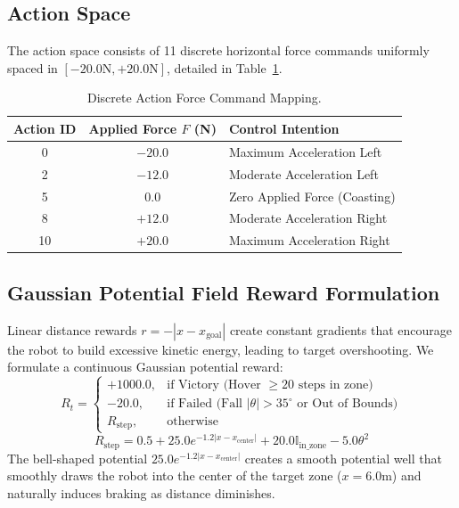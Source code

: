 \documentclass[journal,twocolumn]{IEEEtran}
\begin{document}
\subsection{Action Space}
The action space consists of 11 discrete horizontal force commands uniformly spaced in $[-20.0\text{N}, +20.0\text{N}]$, detailed in Table~\ref{tab:action_space}.

\begin{table}[H]
\centering
\caption{Discrete Action Force Command Mapping.}
\label{tab:action_space}
\begin{tabular}{ccl}
\toprule
\textbf{Action ID} & \textbf{Applied Force $F$ (N)} & \textbf{Control Intention} \\ 
\midrule
0 & $-20.0$ & Maximum Acceleration Left \\
2 & $-12.0$ & Moderate Acceleration Left \\
5 & $0.0$    & Zero Applied Force (Coasting) \\
8 & $+12.0$  & Moderate Acceleration Right \\
10 & $+20.0$ & Maximum Acceleration Right \\
\bottomrule
\end{tabular}
\end{table}

\subsection{Gaussian Potential Field Reward Formulation}
Linear distance rewards $r = -|x - x_{\text{goal}}|$ create constant gradients that encourage the robot to build excessive kinetic energy, leading to target overshooting. We formulate a continuous Gaussian potential reward:
\begin{equation}
R_t = \begin{cases} 
+1000.0, & \text{if Victory (Hover } \ge 20 \text{ steps in zone)} \\
-20.0, & \text{if Failed (Fall } |\theta| > 35^\circ \text{ or Out of Bounds)} \\
R_{\text{step}}, & \text{otherwise}
\end{cases}
\end{equation}
\begin{equation}
R_{\text{step}} = 0.5 + 25.0 e^{-1.2 |x - x_{\text{center}}|} + 20.0 \mathbb{I}_{\text{in\_zone}} - 5.0 \theta^2
\end{equation}
The bell-shaped potential $25.0 e^{-1.2 |x - x_{\text{center}}|}$ creates a smooth potential well that smoothly draws the robot into the center of the target zone ($x=6.0\text{m}$) and naturally induces braking as distance diminishes.
\end{document}
